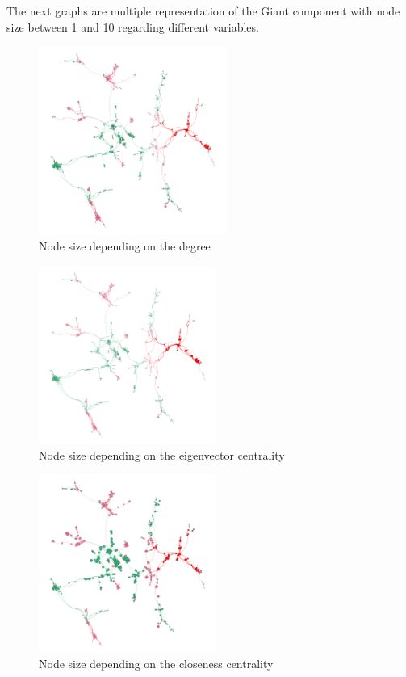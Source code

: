 \documentclass{article}
\begin{document}
    \bigskip
    \noindent The next graphs are multiple representation of the Giant component with node size between 1 and 10 regarding different variables.
    
    \begin{figure}[H]
        \centering
        \includegraphics[width=0.55\textwidth]{4.1.png}
        \caption{Node size depending on the degree}
        \label{fig:figure-4.1}
    \end{figure}
    \begin{figure}[H]
        \centering
        \includegraphics[width=0.52\textwidth]{4.2.png}
        \caption{Node size depending on the eigenvector centrality}
        \label{fig:figure-4.2}
    \end{figure}
    \begin{figure}[H]
        \centering
        \includegraphics[width=0.52\textwidth]{4.3.png}
        \caption{Node size depending on the closeness centrality}
        \label{fig:figure-4.3}
    \end{figure}
\end{document}
